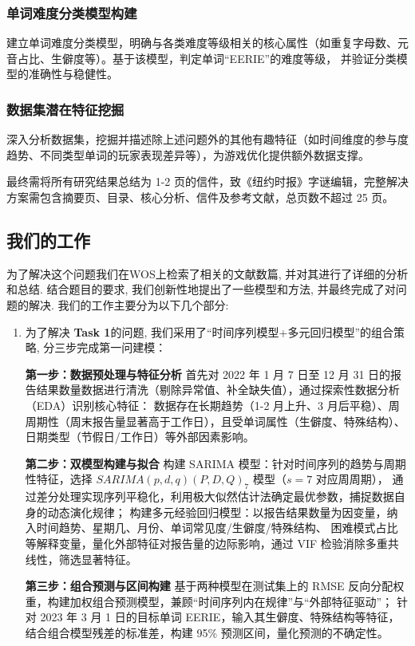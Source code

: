 \documentclass[12pt]{article}  %
\begin{document}
\subsubsection{单词难度分类模型构建}
建立单词难度分类模型，明确与各类难度等级相关的核心属性（如重复字母数、元音占比、生僻度等）。基于该模型，判定单词“EERIE”的难度等级，
并验证分类模型的准确性与稳健性。

\subsubsection{数据集潜在特征挖掘}
深入分析数据集，挖掘并描述除上述问题外的其他有趣特征（如时间维度的参与度趋势、不同类型单词的玩家表现差异等），为游戏优化提供额外数据支撑。

最终需将所有研究结果总结为 1-2 页的信件，致《纽约时报》字谜编辑，完整解决方案需包含摘要页、目录、核心分析、信件及参考文献，总页数不超过 25 页。

\subsection{我们的工作}
为了解决这个问题我们在WOS上检索了相关的文献数篇, 并对其进行了详细的分析和总结. 结合题目的要求, 我们创新性地提出了一些模型和方法,
并最终完成了对问题的解决. 我们的工作主要分为以下几个部分:
\begin{enumerate}[\bfseries 1.]
    \item 为了解决 \textbf{Task 1}的问题, 我们采用了“时间序列模型+多元回归模型”的组合策略, 分三步完成第一问建模：

\noindent \textbf{第一步：数据预处理与特征分析}
首先对 2022 年 1 月 7 日至 12 月 31 日的报告结果数量数据进行清洗（剔除异常值、补全缺失值），通过探索性数据分析（EDA）识别核心特征：
数据存在长期趋势（1-2 月上升、3 月后平稳）、周周期性（周末报告量显著高于工作日），且受单词属性（生僻度、特殊结构）、
日期类型（节假日/工作日）等外部因素影响。

\noindent \textbf{第二步：双模型构建与拟合}
构建 SARIMA 模型：针对时间序列的趋势与周期性特征，选择 $SARIMA(p,d,q)(P,D,Q)_7$ 模型（$s=7$ 对应周周期），
通过差分处理实现序列平稳化，利用极大似然估计法确定最优参数，捕捉数据自身的动态演化规律；
构建多元经验回归模型：以报告结果数量为因变量，纳入时间趋势、星期几、月份、单词常见度/生僻度/特殊结构、
困难模式占比等解释变量，量化外部特征对报告量的边际影响，通过 VIF 检验消除多重共线性，筛选显著特征。

\noindent \textbf{第三步：组合预测与区间构建}
基于两种模型在测试集上的 RMSE 反向分配权重，构建加权组合预测模型，兼顾“时间序列内在规律”与“外部特征驱动”；
针对 2023 年 3 月 1 日的目标单词 EERIE，输入其生僻度、特殊结构等特征，结合组合模型残差的标准差，构建 95\% 预测区间，量化预测的不确定性。
\end{enumerate}
\end{document}
